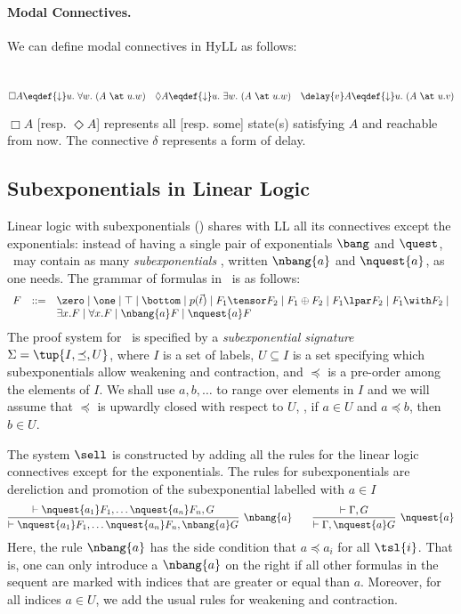 \documentclass{llncs}
\begin{document}
\paragraph{Modal Connectives.}

We can define modal connectives in HyLL as follows:
%
\bgroup 
\begin{definition} \label{def:modal-connectives} \mbox{} \\
\vspace{-1ex}
$$
     \Box A \eqdef {\downarrow} u.~ \forall w.~ (A ~\at~ u . w) \quad
     \Diamond A \eqdef {\downarrow} u.~ \exists w.~ (A ~\at~ u . w) \quad
     \delay{v} A \eqdef {\downarrow} u.~ (A ~\at~ u . v)
$$
\end{definition}
\egroup

\noindent
$\Box A$ [resp. $\Diamond A$] represents all [resp. some] state(s) 
satisfying $A$ and reachable from now. 
% 
The connective $\delta$ represents a form of delay.

% 
\subsection{Subexponentials in Linear Logic}
\label{sec:sell} 
Linear logic with subexponentials
(\sell) shares with LL  all 
its connectives except the exponentials:
instead of having a single pair of exponentials $\bang$ and $\quest$, \sell\ may
contain as many \emph{subexponentials}
 \cite{danos93kgc,OlartePimentelNigam:tcs-15}, 
written $\nbang{a}$  and $\nquest{a}$, as one needs.  
The grammar of formulas in  \sell\  is as follows: 
\[\begin{array}{lcl}
 F &::=& \zero \mid \one \mid  \top \mid \bottom \mid p(\vec t) \mid F_1 \tensor F_2 \mid F_1 \oplus F_2 \mid F_1 \lpar F_2 \mid  F_1 \with F_2 \mid \\
& & \exists x. F \mid \forall x. F\mid  
  \nbang{a} F \mid \nquest{a} F 
 \end{array}
\]
The proof system for \sell\ is specified by a
\emph{subexponential signature} $\Sigma = \tup{I, \preceq, U}$, where $I$
is a set of labels, $U \subseteq I$ is a set specifying which
subexponentials allow weakening and contraction, and $\preceq$ is a
pre-order among the elements of $I$. We shall use $a,b,\ldots$
 to range over elements in $I$ and we will assume that $\preceq$
is upwardly closed with respect to $U$, \ie, if $a \in U$ and $a \preceq
b$, then $b \in U$. 

The system $\sell$ is constructed by adding all the rules for
the linear logic connectives  except for the exponentials. 
The rules for subexponentials are 
dereliction and
promotion of the subexponential labelled with $a \in I$
\[
\infer[\nbang{a}]{\vdash\nquest{a_1} F_1, \ldots \nquest{a_n} F_n, \nbang{a} G}{\vdash\nquest{a_1} F_1, \ldots \nquest{a_n} F_n,  G}
\qquad
\infer[\nquest{a}]{\vdash\Gamma, \nquest{a} G}{\vdash\Gamma, G} 
\]
Here, the rule $\nbang{a}$ has the side condition
that $a\preceq {a_i}$ for all $\tsl{i}$. That is, one can only
introduce a $\nbang{a}$ on the right  if
all other formulas in the sequent are marked with indices that are
greater or equal than $a$. Moreover, for all 
indices $a \in U$, we add the usual  rules for weakening and contraction. 
\end{document}
